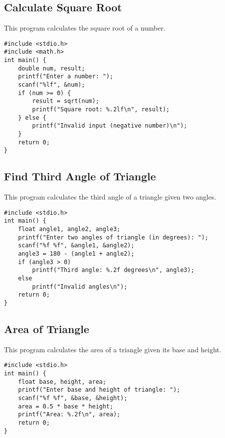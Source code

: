 \documentclass[a4paper,12pt]{article}
\begin{document}
\newpage

\subsection{Calculate Square Root}
This program calculates the square root of a number.

\begin{lstlisting}[caption={Calculate Square Root}]
#include <stdio.h>
#include <math.h>
int main() {
    double num, result;
    printf("Enter a number: ");
    scanf("%lf", &num);
    if (num >= 0) {
        result = sqrt(num);
        printf("Square root: %.2lf\n", result);
    } else {
        printf("Invalid input (negative number)\n");
    }
    return 0;
}
\end{lstlisting}

\newpage

\subsection{Find Third Angle of Triangle}
This program calculates the third angle of a triangle given two angles.

\begin{lstlisting}[caption={Find Third Angle of Triangle}]
#include <stdio.h>
int main() {
    float angle1, angle2, angle3;
    printf("Enter two angles of triangle (in degrees): ");
    scanf("%f %f", &angle1, &angle2);
    angle3 = 180 - (angle1 + angle2);
    if (angle3 > 0)
        printf("Third angle: %.2f degrees\n", angle3);
    else
        printf("Invalid angles\n");
    return 0;
}
\end{lstlisting}

\newpage

\subsection{Area of Triangle}
This program calculates the area of a triangle given its base and height.

\begin{lstlisting}[caption={Area of Triangle}]
#include <stdio.h>
int main() {
    float base, height, area;
    printf("Enter base and height of triangle: ");
    scanf("%f %f", &base, &height);
    area = 0.5 * base * height;
    printf("Area: %.2f\n", area);
    return 0;
}
\end{lstlisting}
\end{document}
